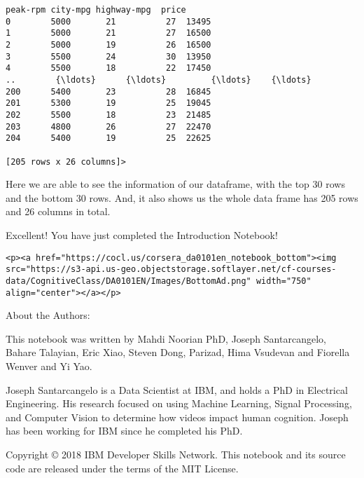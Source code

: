 \documentclass[11pt]{article}
\begin{document}
\begin{tcolorbox}[breakable, size=fbox, boxrule=.5pt, pad at break*=1mm, opacityfill=0]
\begin{Verbatim}[commandchars=\\\{\}]
     peak-rpm city-mpg highway-mpg  price
0        5000       21          27  13495
1        5000       21          27  16500
2        5000       19          26  16500
3        5500       24          30  13950
4        5500       18          22  17450
..        {\ldots}      {\ldots}         {\ldots}    {\ldots}
200      5400       23          28  16845
201      5300       19          25  19045
202      5500       18          23  21485
203      4800       26          27  22470
204      5400       19          25  22625

[205 rows x 26 columns]>
\end{Verbatim}
\end{tcolorbox}
        
    Here we are able to see the information of our dataframe, with the top
30 rows and the bottom 30 rows. And, it also shows us the whole data
frame has 205 rows and 26 columns in total.

    Excellent! You have just completed the Introduction Notebook!

    \begin{verbatim}
<p><a href="https://cocl.us/corsera_da0101en_notebook_bottom"><img src="https://s3-api.us-geo.objectstorage.softlayer.net/cf-courses-data/CognitiveClass/DA0101EN/Images/BottomAd.png" width="750" align="center"></a></p>
\end{verbatim}

    About the Authors:

This notebook was written by Mahdi Noorian PhD, Joseph Santarcangelo,
Bahare Talayian, Eric Xiao, Steven Dong, Parizad, Hima Vsudevan and
Fiorella Wenver and Yi Yao.

Joseph Santarcangelo is a Data Scientist at IBM, and holds a PhD in
Electrical Engineering. His research focused on using Machine Learning,
Signal Processing, and Computer Vision to determine how videos impact
human cognition. Joseph has been working for IBM since he completed his
PhD.

    Copyright © 2018 IBM Developer Skills Network. This notebook and its
source code are released under the terms of the MIT License.


    
    
    
\end{document}
